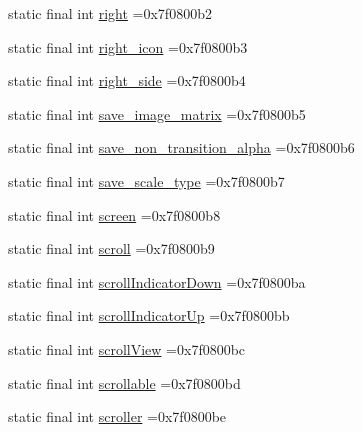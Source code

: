 \begin{DoxyCompactItemize}
static final int \mbox{\hyperlink{classcom_1_1example_1_1trainawearapplication_1_1_r_1_1id_a2b6c9a07996ade33e1e1222eac3fa756}{right}} =0x7f0800b2
\item 
static final int \mbox{\hyperlink{classcom_1_1example_1_1trainawearapplication_1_1_r_1_1id_aff4a31f29df4f33c15bfe90293d87867}{right\+\_\+icon}} =0x7f0800b3
\item 
static final int \mbox{\hyperlink{classcom_1_1example_1_1trainawearapplication_1_1_r_1_1id_aa02d62486d0d7108344aac8fa8d33042}{right\+\_\+side}} =0x7f0800b4
\item 
static final int \mbox{\hyperlink{classcom_1_1example_1_1trainawearapplication_1_1_r_1_1id_a23f3756289debc85e5df97bdcb29c332}{save\+\_\+image\+\_\+matrix}} =0x7f0800b5
\item 
static final int \mbox{\hyperlink{classcom_1_1example_1_1trainawearapplication_1_1_r_1_1id_a215d9c36bd3f703062653c6d132e3b60}{save\+\_\+non\+\_\+transition\+\_\+alpha}} =0x7f0800b6
\item 
static final int \mbox{\hyperlink{classcom_1_1example_1_1trainawearapplication_1_1_r_1_1id_a2099184b8f7db01d6892d0005eee0075}{save\+\_\+scale\+\_\+type}} =0x7f0800b7
\item 
static final int \mbox{\hyperlink{classcom_1_1example_1_1trainawearapplication_1_1_r_1_1id_af9005bf735609d760254a257f775c0a5}{screen}} =0x7f0800b8
\item 
static final int \mbox{\hyperlink{classcom_1_1example_1_1trainawearapplication_1_1_r_1_1id_a37777edced38ebd59b9f5c3f836e43d4}{scroll}} =0x7f0800b9
\item 
static final int \mbox{\hyperlink{classcom_1_1example_1_1trainawearapplication_1_1_r_1_1id_a01bcb7c163f71f6a783904a4870c1789}{scroll\+Indicator\+Down}} =0x7f0800ba
\item 
static final int \mbox{\hyperlink{classcom_1_1example_1_1trainawearapplication_1_1_r_1_1id_af8cb0fa33400a3489722886cc8cdd4ab}{scroll\+Indicator\+Up}} =0x7f0800bb
\item 
static final int \mbox{\hyperlink{classcom_1_1example_1_1trainawearapplication_1_1_r_1_1id_ae18ebfcbf321cee37fe8215c0c6061ce}{scroll\+View}} =0x7f0800bc
\item 
static final int \mbox{\hyperlink{classcom_1_1example_1_1trainawearapplication_1_1_r_1_1id_a0b0c0580e1ed1ed93e834bd0648b4326}{scrollable}} =0x7f0800bd
\item 
static final int \mbox{\hyperlink{classcom_1_1example_1_1trainawearapplication_1_1_r_1_1id_a46b1f30c947fd165ffe10ab4ae5fefc8}{scroller}} =0x7f0800be

\end{DoxyCompactItemize}
